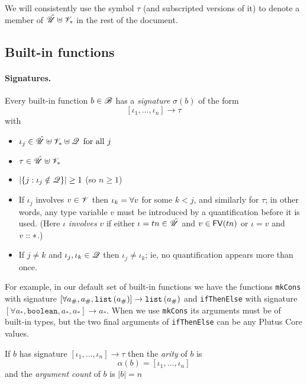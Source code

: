 We will consistently use the symbol $\tau$ (and subscripted versions of it)
to denote a member of $\hat{\mathscr{U}} \uplus \mathscr{V}_*$ in the rest of the document.


\subsection{Built-in functions}
\label{sec:builtin-functions}

\paragraph{Signatures.}
Every built-in function $b \in \mathscr{B}$ has a \textit{signature} $\sigma(b)$ of the form
$$[\iota_1, \ldots, \iota_n] \rightarrow \tau$$
with
\begin{itemize}
  \item $\iota_j \in \hat{\mathscr{U}} \uplus \mathscr{V}_* \uplus \mathscr{Q} \enspace\mbox{for all $j$}$
  \item $\tau \in \hat{\mathscr{U}} \uplus \mathscr{V}_*$
  \item $\lvert\{j : \iota_j \notin \mathscr{Q}\}\rvert \geq 1$ (so $n \geq 1$)
  \item If $\iota_j$ involves $v \in \mathscr{V}$ then $\iota_k = \mathbf{\forall}v$ for
    some $k < j$, and similarly for $\tau$; in other words, any type variable
    $v$ must be introduced by a quantification before it is used. (Here $\iota$
    \textit{involves} $v$ if either $\iota = tn \in \hat{\mathscr{U}}$ and $v \in \mathsf{FV}(tn)$
    or $\iota = v$ and $\kindstar{v}$.)
  \item If $j \neq k$ and $\iota_j, \iota_k \in \mathscr{Q}$ then $\iota_j \neq
    \iota_k$; ie, no quantification appears more than once.
\end{itemize}
\noindent 


\noindent For example, in our default set of built-in functions we have the
functions \texttt{mkCons} with signature $[\forall a_\#, a_\#,
  \mathtt{list}\,\mathtt{(}a_\#\mathtt{)}] \rightarrow \mathtt{list}\,\mathtt{(}a_\#\mathtt{)}$ and \texttt{ifThenElse} with signature
$[\forall a_*, \mathtt{boolean}, a_*, a_*] \rightarrow a_*$.  When we use
\texttt{mkCons} its arguments must be of built-in types, but the two final
arguments of \texttt{ifThenElse} can be any Plutus Core values.


\noindent If $b$ has signature $[\iota_1, \ldots, \iota_n] \rightarrow \tau$ then the \textit{arity}
of $b$ is
$$
  \alpha(b) = [\iota_1, \ldots, \iota_n]
$$
and the \textit{argument count} of $b$ is $\left|b\right| = n$
  

